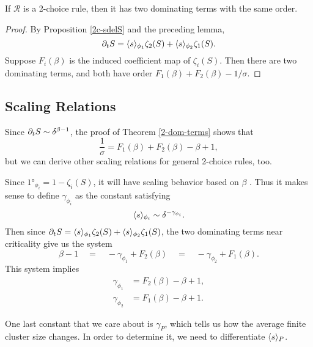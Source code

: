 \documentclass[twoside,10pt]{article}
\begin{document}


\begin{thrm}
	\label{2-dom-terms}
If $\mathcal{R}$ is a 2-choice rule, then it has two dominating terms with the same order.
\end{thrm}
\begin{proof}
	By Proposition \ref{2c-sdelS} and the preceding lemma,
        \[
	\partial_{t}{S} = \langle s \rangle_{\phi_1}\zeta_{2}(S) + \langle s \rangle_{\phi_2} \zeta_{1}(S).
	\]
	Suppose $F_i(\beta)$ is the induced coefficient map of $\zeta_i(S)$. Then there are two dominating terms, and both have order $F_1(\beta) + F_2(\beta) - 1/\sigma$.
\end{proof}

\subsection{Scaling Relations}

Since $\partial_{t}{S} \sim \delta^{\beta-1}$, the proof of Theorem \ref{2-dom-terms} shows that
\begin{equation}
	\frac{1}{\sigma} = F_1(\beta) + F_2(\beta) - \beta + 1,
\end{equation}
but we can derive other scaling relations for general 2-choice rules, too.

Since $\ang{1}_{\phi_i} = 1 - \zeta_i(S)$, it will have scaling behavior based on $\beta$ . Thus it makes sense to define $\gamma_{\phi_i}$ as the constant satisfying
\[
\langle s \rangle_{\phi_i} \sim \delta^{-\gamma_{\phi_i}}.
\] 
Then since $\partial_{t}{S} = \langle s \rangle_{\phi_1}\zeta_2(S) + \langle s \rangle_{\phi_2}\zeta_1(S)$, the two dominating terms near criticality give us the system
\[
	\beta -1 \quad=\quad -\gamma_{\phi_1} + F_2(\beta) \quad=\quad -\gamma_{\phi_2} + F_1(\beta).
\] 
This system implies
\begin{align}
	\gamma_{\phi_1} &= F_2(\beta) - \beta + 1,\\
	\gamma_{\phi_2} &= F_1(\beta) - \beta + 1.
\end{align}

One last constant that we care about is $\gamma_{P}$, which tells us how the average finite cluster size changes. In order to determine it, we need to differentiate $\langle s \rangle_{P}$.
\end{document}
